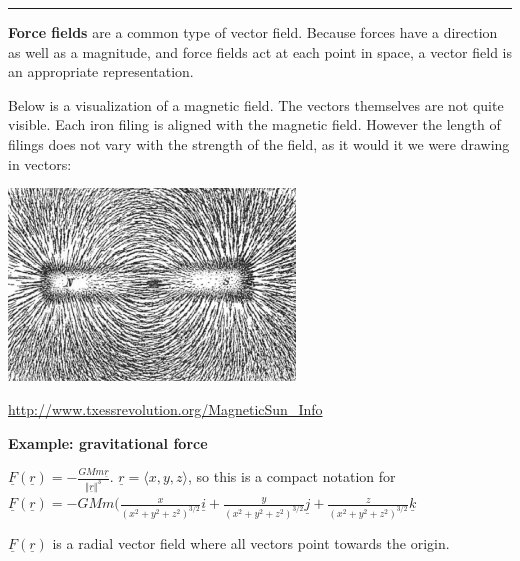 \documentclass[12pt,letterpaper,noanswers]{exam}
\newcommand{\mb}[1]{\underline{#1}}
\begin{document}
\vfill




\vspace{0.2cm}
\hrule
\vspace{0.2cm}

\begin{tcolorbox}


\noindent\textbf{Force fields} are a common type of vector field.  Because forces have a direction as well as a magnitude, and force fields act at each point in space, a vector field is an appropriate representation. 
\end{tcolorbox}

Below is a visualization of a magnetic field.  The vectors themselves are not quite visible.  Each iron filing is aligned with the magnetic field.  However the length of filings does not vary with the strength of the field, as it would it we were drawing in vectors:

\includegraphics[width=3in]{img/C24p5.png}

\url{http://www.txessrevolution.org/MagneticSun_Info}

\vspace{0.1cm}

\noindent\textbf{Example: gravitational force}

$\displaystyle\mb F(\mb r) = -\frac{GMm\mb r}{\Vert \mb r\Vert^3}$.  $\mb r = \langle x, y, z\rangle$, so this is a compact notation for
$\displaystyle\mb F(\mb r) = -GMm(\frac{x}{(x^2+y^2+z^2)^{3/2}}\mb i+\frac{y}{(x^2+y^2+z^2)^{3/2}}\mb j + \frac{z}{(x^2+y^2+z^2)^{3/2}}\mb k$
 
$\mb F(\mb r)$ is a radial vector field where all vectors point towards the origin.
 
\end{document}
